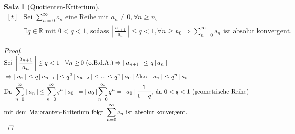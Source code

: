 \documentclass[a4paper,titlepage,oneside]{article}
\def\R{\ensuremath{\mathbb{R}} }
\newcommand{\suminf}[2][n]{\ensuremath{\sum_{#1= 0}^{\infty}{#2}}}
\newcommand{\abs}[1]{\ensuremath{\left|\:#1\:\right|}}
\theoremstyle{thmstyle}
\newtheorem{satz}{Satz}[section]
\theoremstyle{subthmstyle}
\begin{document}
\begin{satz}[Quotienten-Kriterium]
\begin{math}\displaystyle \begin{aligned}[t]
&\text{Sei } \suminf{a_n} \text{ eine Reihe mit } a_n \ne 0 , \forall n \ge n_0 \\
&\exists q\in \R \text{ mit } 0 < q < 1 \text{, sodass } \abs{\frac{a_{n+1}}{a_n}} \le q < 1, \forall n \ge n_0 \Rightarrow \suminf{a_n} \text{ ist absolut konvergent.}
\end{aligned}\end{math}

\begin{proof}
\begin{math}\displaystyle \begin{aligned}[t]
&\text{Sei } \abs{\frac{a_{n+1}}{a_n}} \le q < 1 \quad \forall n \ge 0 \text{ (o.B.d.A.)} \Rightarrow \abs{a_{n+1}} \le q \abs{a_n} \\
&\Rightarrow \abs{a_n} \le q\abs{a_{n-1}} \le q^2 \abs{a_{n-2}} \le ... \le q^n \abs{a_0} \text{Also } \abs{a_n} \le q^n \abs{a_0}\\
&\text{Da } \suminf{\abs{a_n}} \le \suminf{q^n \abs{a_0}} = \abs{a_0} \suminf{q^n} = \abs{a_0} \frac{1}{1-q} \text{, da } 0 < q < 1 \text{ (geometrische Reihe)} \\
&\text{mit dem Majoranten-Kriterium folgt } \suminf{a_n} \text{ ist absolut konvergent.}
\end{aligned}\\\end{math}
\end{proof}
\end{satz}
\end{document}

